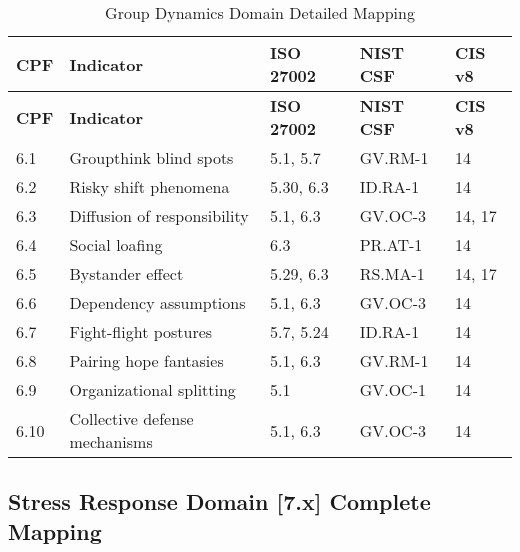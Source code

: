 \documentclass[11pt,a4paper]{article}
\begin{document}
\begin{longtable}{p{1cm}p{4cm}p{2.5cm}p{2.5cm}p{2cm}}
\caption{Group Dynamics Domain Detailed Mapping} \\
\toprule
\textbf{CPF} & \textbf{Indicator} & \textbf{ISO 27002} & \textbf{NIST CSF} & \textbf{CIS v8} \\
\midrule
\endfirsthead
\toprule
\textbf{CPF} & \textbf{Indicator} & \textbf{ISO 27002} & \textbf{NIST CSF} & \textbf{CIS v8} \\
\midrule
\endhead
\bottomrule
\endlastfoot

6.1 & Groupthink blind spots & 5.1, 5.7 & GV.RM-1 & 14 \\
6.2 & Risky shift phenomena & 5.30, 6.3 & ID.RA-1 & 14 \\
6.3 & Diffusion of responsibility & 5.1, 6.3 & GV.OC-3 & 14, 17 \\
6.4 & Social loafing & 6.3 & PR.AT-1 & 14 \\
6.5 & Bystander effect & 5.29, 6.3 & RS.MA-1 & 14, 17 \\
6.6 & Dependency assumptions & 5.1, 6.3 & GV.OC-3 & 14 \\
6.7 & Fight-flight postures & 5.7, 5.24 & ID.RA-1 & 14 \\
6.8 & Pairing hope fantasies & 5.1, 6.3 & GV.RM-1 & 14 \\
6.9 & Organizational splitting & 5.1 & GV.OC-1 & 14 \\
6.10 & Collective defense mechanisms & 5.1, 6.3 & GV.OC-3 & 14 \\

\end{longtable}

\subsection{Stress Response Domain [7.x] Complete Mapping}
\end{document}
